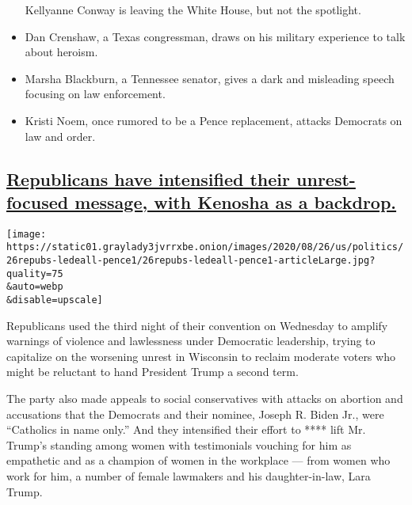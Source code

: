 \begin{itemize}
  Kellyanne Conway is leaving the White House, but not the spotlight.
\item
  \protect\hyperlink{dan-crenshaw-a-texas-congressman-draws-on-his-military-experience-to-talk-about-heroism}{}

  Dan Crenshaw, a Texas congressman, draws on his military experience to
  talk about heroism.
\item
  \protect\hyperlink{marsha-blackburn-a-tennessee-senator-gives-a-dark-and-misleading-speech-focusing-on-law-enforcement}{}

  Marsha Blackburn, a Tennessee senator, gives a dark and misleading
  speech focusing on law enforcement.
\item
  \protect\hyperlink{kristi-noem-once-rumored-to-be-a-pence-replacement-attacks-democrats-on-law-and-order}{}

  Kristi Noem, once rumored to be a Pence replacement, attacks Democrats
  on law and order.
\end{itemize}

\hypertarget{republicans-have-intensified-their-unrest-focused-message-with-kenosha-as-a-backdrop}{%
\subsection{\texorpdfstring{\protect\hyperlink{republicans-have-intensified-their-unrest-focused-message-with-kenosha-as-a-backdrop}{Republicans
have intensified their unrest-focused message, with Kenosha as a
backdrop.}}{Republicans have intensified their unrest-focused message, with Kenosha as a backdrop.}}\label{republicans-have-intensified-their-unrest-focused-message-with-kenosha-as-a-backdrop}}

\texttt{[image: https://static01.graylady3jvrrxbe.onion/images/2020/08/26/us/politics/26repubs-ledeall-pence1/26repubs-ledeall-pence1-articleLarge.jpg?quality=75\\\&auto=webp\\\&disable=upscale]}

Republicans used the third night of their convention on Wednesday to
amplify warnings of violence and lawlessness under Democratic
leadership, trying to capitalize on the worsening unrest in Wisconsin to
reclaim moderate voters who might be reluctant to hand President Trump a
second term.

The party also made appeals to social conservatives with attacks on
abortion and accusations that the Democrats and their nominee, Joseph R.
Biden Jr., were ``Catholics in name only.'' And they intensified their
effort to **** lift Mr. Trump's standing among women with testimonials
vouching for him as empathetic and as a champion of women in the
workplace --- from women who work for him, a number of female lawmakers
and his daughter-in-law, Lara Trump.

